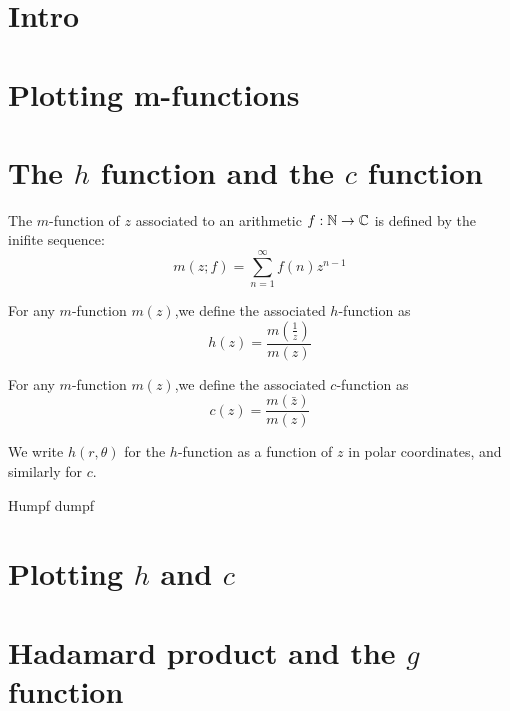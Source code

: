 \documentclass[a4paper]{amsart}
\begin{document}
\section{Intro}


\section{Plotting m-functions}


\section{The $h$ function and the $c$ function}


\begin{definition}
  The $m$-function of $z$ associated to an arithmetic $f : \mathbb{N} \to \mathbb{C}$ is defined by the inifite sequence:
  $$m(z; f) = \sum_{n = 1}^{\infty} f(n) z^{n - 1}$$
\end{definition}

\begin{definition}
For any $m$-function $m(z)$,we define the associated $h$-function as
$$ h(z) = \frac{m(\frac{1}{z})}{m(z) }  $$

\end{definition}

\begin{definition}
For any $m$-function $m(z)$,we define the associated $c$-function as
$$c(z) = \frac{m(\bar{z})}{m(z)}$$

\end{definition}

We write $h(r, \theta)$ for the $h$-function as a function of $z$ in polar coordinates, and similarly for $c$.

\begin{proposition}
Humpf dumpf

\end{proposition}

\section{Plotting $h$ and $c$}




\section{Hadamard product and the $g$ function}
\end{document}
